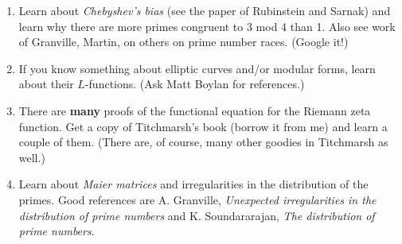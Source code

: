 \documentclass[12pt]{article}
\begin{document}
\begin{enumerate}
\item Learn about {\itshape Chebyshev's bias} (see the paper of Rubinstein and Sarnak) and learn why there
are more primes congruent to 3 mod 4 than 1. Also see work of Granville, Martin, on others on prime number
races. (Google it!)

\item If you know something about elliptic curves and/or modular forms, learn about their $L$-functions.
(Ask Matt Boylan for references.)

\item There are {\bf many} proofs of the functional equation for the Riemann zeta function. Get a copy
of Titchmarsh's book (borrow it from me) and learn a couple of them. (There are, of course, many other
goodies in Titchmarsh as well.)

\item Learn about {\itshape Maier matrices} and irregularities in the distribution of the primes.
Good references are A. Granville, {\itshape Unexpected irregularities in the distribution of prime
numbers} and K. Soundararajan, {\itshape The distribution of prime numbers}.

\end{enumerate}
\end{document}
